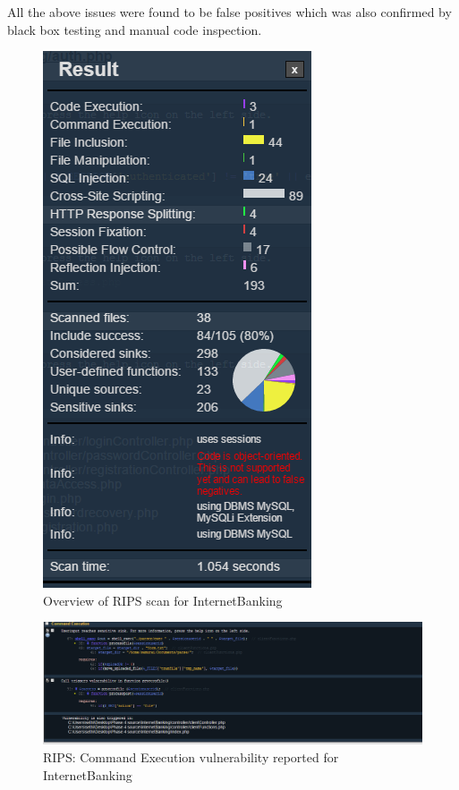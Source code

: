 All the above issues were found to be false positives which was also confirmed by black box testing and manual code inspection.

\begin{figure}[ht]
	\centering
	\includegraphics[width=.8\linewidth]{figures/rips_overview.png}
	\caption{Overview of RIPS scan for InternetBanking}
	\label{fig:rips_overview}
\end{figure}

\begin{figure}[ht]
	\centering
	\includegraphics[width=.8\linewidth]{figures/rips_command_execution.png}
	\caption{RIPS: Command Execution vulnerability reported for InternetBanking}
	\label{fig:rips_command_execution}
\end{figure}

